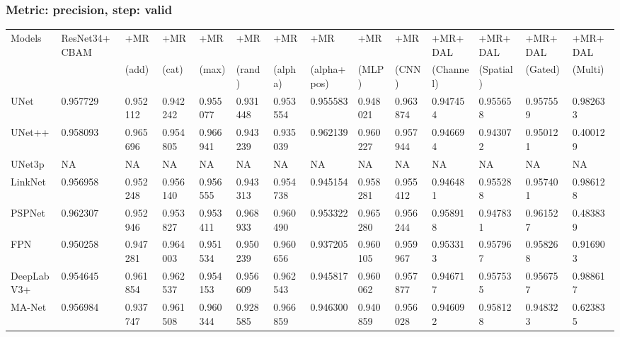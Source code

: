 \documentclass{article}
\begin{document}
\subsubsection{Metric: precision, step: valid}
\begin{tabular}{llllllllllllll}
\toprule
Models & ResNet34+CBAM & +MR  & +MR  & +MR  & +MR  & +MR  & +MR  & +MR  & +MR  & +MR+DAL & +MR+DAL & +MR+DAL & +MR+DAL \\
       &             &  (add) &  (cat) &  (max) &  (rand) &  (alpha) &  (alpha+pos) &  (MLP) &  (CNN) & (Channel) & (Spatial) & (Gated) & (Multi) \\
\midrule
UNet & 0.957729 & 0.952112 & 0.942242 & 0.955077 & 0.931448 & 0.953554 & 0.955583 & 0.948021 & 0.963874 & 0.947454 & 0.955658 & 0.957559 & 0.982633 \\
UNet++ & 0.958093 & 0.965696 & 0.954805 & 0.966941 & 0.943239 & 0.935039 & 0.962139 & 0.960227 & 0.957944 & 0.946694 & 0.943072 & 0.950121 & 0.400129 \\
UNet3p & NA & NA & NA & NA & NA & NA & NA & NA & NA & NA & NA & NA & NA \\
LinkNet & 0.956958 & 0.952248 & 0.956140 & 0.956555 & 0.943313 & 0.954738 & 0.945154 & 0.958281 & 0.955412 & 0.946481 & 0.955288 & 0.957401 & 0.986128 \\
PSPNet & 0.962307 & 0.952946 & 0.953827 & 0.953411 & 0.968933 & 0.960490 & 0.953322 & 0.965280 & 0.956244 & 0.958918 & 0.947831 & 0.961527 & 0.483839 \\
FPN & 0.950258 & 0.947281 & 0.964003 & 0.951534 & 0.950239 & 0.960656 & 0.937205 & 0.960105 & 0.959967 & 0.953313 & 0.957967 & 0.958268 & 0.916903 \\
DeepLabV3+ & 0.954645 & 0.961854 & 0.962537 & 0.954153 & 0.956609 & 0.962543 & 0.945817 & 0.960062 & 0.957877 & 0.946717 & 0.957535 & 0.956757 & 0.988617 \\
MA-Net & 0.956984 & 0.937747 & 0.961508 & 0.960344 & 0.928585 & 0.966859 & 0.946300 & 0.940859 & 0.956028 & 0.946092 & 0.958128 & 0.948323 & 0.623835 \\
\bottomrule
\end{tabular}
\end{document}

